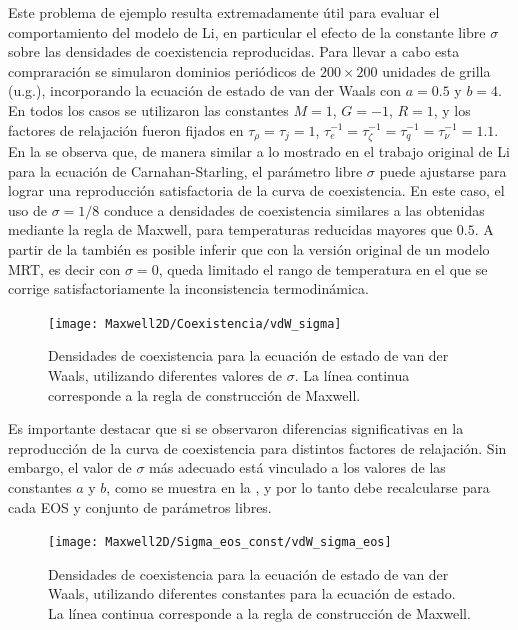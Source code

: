 Este problema de ejemplo resulta extremadamente \'util para evaluar el comportamiento del modelo de Li, en particular el efecto de la constante libre $\sigma$ sobre las densidades de coexistencia reproducidas. Para llevar a cabo esta compraraci\'on se simularon dominios peri\'odicos de $200\times 200$ unidades de grilla (u.g.), incorporando la ecuaci\'on de estado de van der Waals con $a=0.5$ y $b=4$. En todos los casos se utilizaron las constantes $M=1$, $G=-1$, $R=1$, y los factores de relajaci\'on fueron fijados en $\tau_{\rho} = \tau_j=1$, $\tau_{e}^{-1}=\tau_{\zeta}^{-1}=\tau_{q}^{-1}=\tau_{\nu}^{-1}=1.1$. En la  se observa que, de manera similar a lo mostrado en el trabajo original de Li \cite{li_lattice_2013} para la ecuaci\'on de Carnahan-Starling, el par\'ametro libre $\sigma$ puede ajustarse para lograr una reproducci\'on satisfactoria de la curva de coexistencia. En este caso, el uso de $\sigma=1/8$ conduce a densidades de coexistencia similares a las obtenidas mediante la regla de Maxwell, para temperaturas reducidas mayores que $0.5$. A partir de la  tambi\'en es posible inferir que con la versi\'on original de un modelo \pp{} MRT, es decir con $\sigma=0$, queda limitado el rango de temperatura en el que se corrige satisfactoriamente la inconsistencia termodin\'amica.

\begin{figure}[ht]
	\centering
	\texttt{[image: Maxwell2D/Coexistencia/vdW\_sigma]}
	\caption{Densidades de coexistencia para la ecuaci\'on de estado de van der Waals, utilizando diferentes valores de $\sigma$. La l\'inea continua corresponde a la regla de construcci\'on de Maxwell.}
	\label{fig:maxwell_vdW}
\end{figure}

Es importante destacar que si se observaron diferencias significativas en la reproducci\'on de la curva de coexistencia para distintos factores de relajaci\'on. Sin embargo, el valor de $\sigma$ m\'as adecuado est\'a vinculado a los valores de las constantes $a$ y $b$, como se muestra en la , y por lo tanto debe recalcularse para cada EOS y conjunto de par\'ametros libres.

\begin{figure}[ht]
	\centering
	\texttt{[image: Maxwell2D/Sigma\_eos\_const/vdW\_sigma\_eos]}
	\caption{Densidades de coexistencia para la ecuaci\'on de estado de van der Waals, utilizando diferentes constantes para la ecuaci\'on de estado. La l\'inea continua corresponde a la regla de construcci\'on de Maxwell.}
	\label{fig:maxwell_vdW_eos}
\end{figure}


